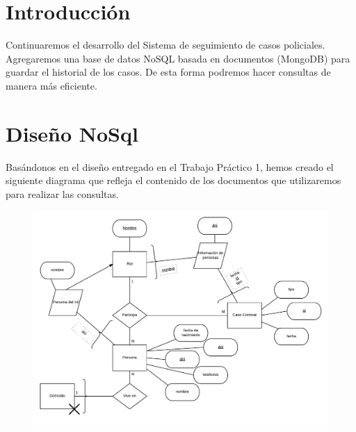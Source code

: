 \documentclass[10pt,a4paper]{article}
\begin{document}

\fecha{\today}


\maketitle

\tableofcontents
\newpage

\section{Introducción}
Continuaremos el desarrollo del Sistema de seguimiento de casos policiales. Agregaremos una base de datos NoSQL basada en documentos (MongoDB) para guardar el historial de los casos. De esta forma podremos hacer consultas de manera más eficiente.

\section{Diseño NoSql}
Basándonos en el diseño entregado en el Trabajo Práctico 1, hemos creado el siguiente diagrama que refleja el contenido de los documentos que utilizaremos para realizar las consultas.

\begin{figure}[h]
	\centering
	\includegraphics[width=\linewidth]{imagenes/DID.png}
\end{figure}
\end{document}
